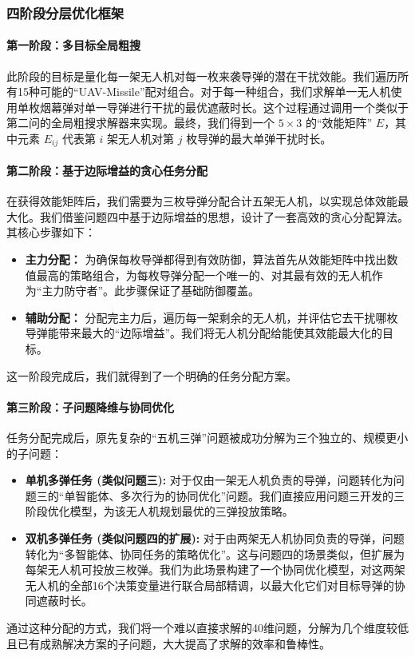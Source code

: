 \documentclass[12pt]{article}
\begin{document}
\begin{CJK}{UTF8}{gbsn}
		\subsubsection{四阶段分层优化框架}
		
		\paragraph{第一阶段：多目标全局粗搜}
		此阶段的目标是量化每一架无人机对每一枚来袭导弹的潜在干扰效能。我们遍历所有15种可能的“UAV-Missile”配对组合。对于每一种组合，我们求解单一无人机使用单枚烟幕弹对单一导弹进行干扰的最优遮蔽时长。这个过程通过调用一个类似于第二问的全局粗搜求解器来实现。最终，我们得到一个 $5 \times 3$ 的“效能矩阵” $E$，其中元素 $E_{ij}$ 代表第 $i$ 架无人机对第 $j$ 枚导弹的最大单弹干扰时长。
		
		\paragraph{第二阶段：基于边际增益的贪心任务分配}
		在获得效能矩阵后，我们需要为三枚导弹分配合计五架无人机，以实现总体效能最大化。我们借鉴问题四中基于边际增益的思想，设计了一套高效的贪心分配算法。其核心步骤如下：
		
		\begin{itemize}
			\item \textbf{主力分配：} 为确保每枚导弹都得到有效防御，算法首先从效能矩阵中找出数值最高的策略组合，为每枚导弹分配一个唯一的、对其最有效的无人机作为“主力防守者”。此步骤保证了基础防御覆盖。
			\item \textbf{辅助分配：} 分配完主力后，遍历每一架剩余的无人机，并评估它去干扰哪枚导弹能带来最大的“边际增益”。我们将无人机分配给能使其效能最大化的目标。
		\end{itemize}
		这一阶段完成后，我们就得到了一个明确的任务分配方案。
		
		\paragraph{第三阶段：子问题降维与协同优化}
		任务分配完成后，原先复杂的“五机三弹”问题被成功分解为三个独立的、规模更小的子问题：
		\begin{itemize}
			\item \textbf{单机多弹任务 (类似问题三):} 对于仅由一架无人机负责的导弹，问题转化为问题三的“单智能体、多次行为的协同优化”问题。我们直接应用问题三开发的三阶段优化模型，为该无人机规划最优的三弹投放策略。
			\item \textbf{双机多弹任务 (类似问题四的扩展):} 对于由两架无人机协同负责的导弹，问题转化为“多智能体、协同任务的策略优化”。这与问题四的场景类似，但扩展为每架无人机可投放三枚弹。我们为此场景构建了一个协同优化模型，对这两架无人机的全部16个决策变量进行联合局部精调，以最大化它们对目标导弹的协同遮蔽时长。
		\end{itemize}
		通过这种分配的方式，我们将一个难以直接求解的40维问题，分解为几个维度较低且已有成熟解决方案的子问题，大大提高了求解的效率和鲁棒性。
		

\end{CJK}
\end{document}

